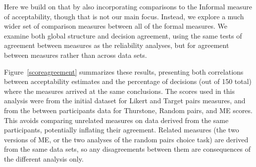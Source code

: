 \documentclass[doc]{apa6}
\newcommand{\targchoice}{{\sc Target pairs}}
\newcommand{\rndchoice}{{\sc Random pairs}}
\newcommand{\ME}{{\sc ME}}%
\newcommand{\thurstone}{{\sc Thurstone}}
\newcommand{\likert}{{\sc Likert}}
\newcommand{\choicetask}{choice task}
\newcommand{\initial}{{\sc initial}}
\newcommand{\betweenppnt}{{\sc between participants}}
\begin{document}
Here we build on that by also incorporating comparisons to the {\sc Informal} measure of acceptability, though that is not our main focus. Instead, we explore a much wider set of comparison measures between all of the formal measures. We examine both global structure and decision agreement, using the same tests of agreement between measures as the reliability analyses, but for agreement between measures rather than across data sets.

Figure~\ref{scoreagreement} summarizes these results, presenting both correlations between acceptability estimates and the percentage of decisions (out of 150 total) where the measures arrived at the same conclusions. The scores used in this analysis were from the \initial{} dataset for \likert{} and \targchoice{} measures, and from the \betweenppnt{} data for \thurstone, \rndchoice, and \ME{} scores. This avoids comparing unrelated measures on data derived from the same participants, potentially inflating their agreement. Related measures (the two versions of \ME, or the two analyses of the random pairs \choicetask) are derived from the same data sets, so any disagreements between them are consequences of the different analysis only.
\end{document}
